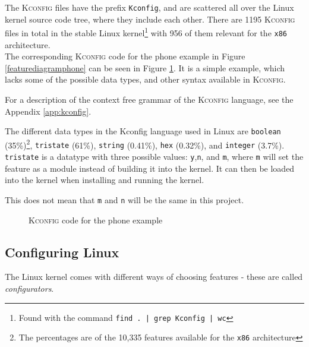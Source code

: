\documentclass[a4paper,11pt]{report}
\newcommand{\f}{\footnote{\fn}}
\newcommand{\textcode}[1]{\fboxsep=1pt\texttt{\colorbox{gray!20}{#1}}}
\newcommand{\figa}{
    \begin{figure}[!htpb]
    \centering
}
\newcommand{\figb}[2]{
    \caption{#1}
    \label{#2}
    \end{figure}
}
\begin{document}
            \def \fn{Found with the command \textcode{find .\ | grep Kconfig | wc}}

The \textsc{Kconfig} files have the prefix \textcode{Kconfig}, and are 
scattered all over the Linux kernel source code tree, where they include each 
other. There are 1195 \textsc{Kconfig} files in total in the stable Linux kernel\f
with 956 of them relevant for the \texttt{x86} architecture.
\\

The corresponding \textsc{Kconfig} code for the phone example in Figure 
\ref{featurediagramphone} can be seen in Figure \ref{kconfigphone}. It 
is a simple example, which lacks some of the possible data types, and other 
syntax available in \textsc{Kconfig}.

For a description of the context free grammar of 
the \textsc{Kconfig} language, see the Appendix \ref{app:kconfig}.
\\

            \def \fn {The percentages are of the 10,335 features available for 
                the \texttt{x86} architecture}

The different data types in the Kconfig language used in Linux are 
\textcode{boolean} (35\%)\f, 
\textcode{tristate} (61\%), \textcode{string} (0.41\%), \textcode{hex} 
(0.32\%), and \textcode{integer} (3.7\%). \texttt{tristate} is a datatype 
with three possible values: \texttt{y},\texttt{n}, and \texttt{m}, where 
\texttt{m} will set the feature as a module instead of building it into the 
kernel. It can then be loaded into the kernel when installing and running the 
kernel.

This does not mean that \texttt{m} and \texttt{n} will be the same in this 
project.




\figa
    \subfigure{
        
    }
\figb{\textsc{Kconfig} code for the phone example}{kconfigphone}

            \subsection{Configuring Linux}
            \label{sec:conf}

The Linux kernel comes with different ways of choosing features - these are 
called \emph{configurators}. 
\end{document}
